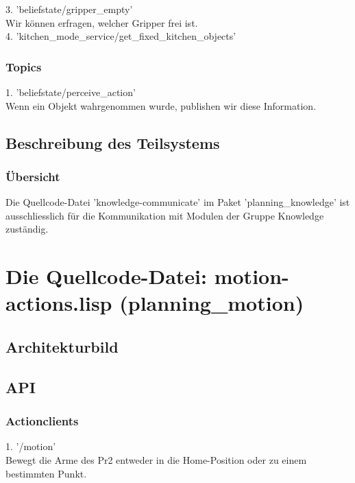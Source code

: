 \documentclass{suturo}
\begin{document}
3. 'beliefstate/gripper\_empty'\\
Wir können erfragen, welcher Gripper frei ist.\\

4. 'kitchen\_mode\_service/get\_fixed\_kitchen\_objects'\\
\subsubsection{Topics}
1. 'beliefstate/perceive\_action'\\
Wenn ein Objekt wahrgenommen wurde, publishen wir diese Information.


\subsection{Beschreibung des Teilsystems}
\subsubsection{\"Ubersicht}
Die Quellcode-Datei 'knowledge-communicate' im Paket 'planning\_knowledge' ist ausschliesslich für die Kommunikation mit Modulen der Gruppe Knowledge zust\"andig.




\section{Die Quellcode-Datei: motion-actions.lisp (planning\_motion)}
\subsection{Architekturbild}


\begin{figure}[!htb]
\end{figure}




\subsection{API}
\subsubsection{Actionclients}
1. '/motion' \\
Bewegt die Arme des Pr2 entweder in die Home-Position oder zu einem bestimmten Punkt.
\end{document}
